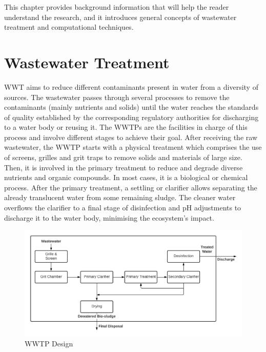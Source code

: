 This chapter provides background information that will help the reader understand the research, and it introduces general concepts of wastewater treatment and computational techniques. 

\section{Wastewater Treatment}
\label{s:First-Background-Topic}

\ac{WWT} aims to reduce different contaminants present in water from a diversity of sources. The wastewater passes through several processes to remove the contaminants (mainly nutrients and solids) until the water reaches the standards of quality established by the corresponding regulatory authorities for discharging to a water body or reusing it. The \ac{WWTP}s are the facilities in charge of this process and involve different stages to achieve their goal. After receiving the raw wastewater, the \ac{WWTP} starts with a physical treatment which comprises the use of screens, grilles and grit traps to remove solids and materials of large size. Then, it is involved in the primary treatment to reduce and degrade diverse nutrients and organic compounds. In most cases, it is a biological or chemical process. After the primary treatment, a settling or clarifier allows separating the already translucent water from some remaining sludge. The cleaner water overflows the clarifier to a final stage of disinfection and pH adjustments to discharge it to the water body, minimising the ecosystem's impact.

\begin{figure}[h]
\centering
\includegraphics[width=15cm]{figures/Ch2/WWTP.pdf}
\caption{WWTP Design}
\label{f:wwtp}
\end{figure}


